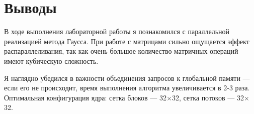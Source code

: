 \section{Выводы}
В ходе выполнения лабораторной работы я познакомился с параллельной реализацией метода Гаусса. При работе с матрицами сильно ощущается эффект распараллеливания, так как очень большое количество матричных операций имеют кубическую сложность.

Я наглядно убедился в важности объединения запросов к глобальной памяти --- если его не происходит, время выполнения алгоритма увеличивается в 2-3 раза. Оптимальная конфигурация ядра: сетка блоков --- 32$\times$32, сетка потоков --- 32$\times$32.
\pagebreak
